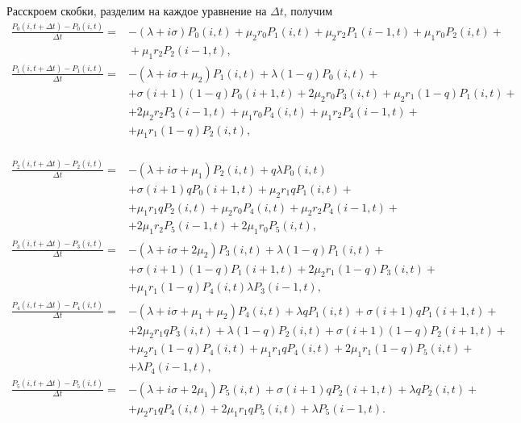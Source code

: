 Расскроем скобки, разделим на каждое уравнение на $\Delta t$, получим
 \begin{equation*}
	\begin{split}
		\frac{P_{0}(i,t+\Delta t) - P_{0}(i, t)}{\Delta t}=&-(\lambda+i\sigma)P_{0}(i,t)+\mu_{2}r_{0}P_{1}(i,t)+\mu_{2}r_{2}P_{1}(i-1,t)+\mu_{1}r_{0}P_{2}(i,t)+\\
		&{}+\mu_{1}r_{2}P_{2}(i-1,t),\\
		\frac{P_{1}(i,t+\Delta t) - P_{1}(i, t)}{\Delta t}=&-(\lambda+i\sigma+\mu_{2})P_{1}(i,t)+\lambda(1-q)P_{0}(i,t)+\\
		&+\sigma(i+1)(1-q)P_{0}(i+1,t)+2\mu_{2}r_{0}P_{3}(i,t) + \mu_{2}r_{1}(1-q)P_{1}(i,t)+\\
		&+2\mu_{2}r_{2}P_{3}(i-1,t)+\mu_{1}r_{0}P_{4}(i,t)+\mu_{1}r_{2}P_{4}(i-1,t)+\\
		&+\mu_{1}r_{1}(1-q)P_{2}(i,t),\\
	\end{split}
\end{equation*}
\begin{adjustwidth}{0pt}{0pt}
	\begin{align*}
		\frac{P_{2}(i,t+\Delta t) - P_{2}(i, t)}{\Delta t}=&-(\lambda+i\sigma+\mu_{1})P_{2}(i,t)+q\lambda P_{0}(i,t)\\
		&+\sigma(i+1)qP_{0}(i+1,t)+\mu_{2}r_{1}qP_{1}(i,t)+\\
		&+\mu_{1}r_{1}qP_{2}(i,t)+\mu_{2}r_{0}P_{4}(i,t)+\mu_{2}r_{2}P_{4}(i-1,t)+\\
		&+2\mu_{1}r_{2}P_{5}(i-1,t)+2\mu_{1}r_{0}P_{5}(i,t),\\
		\frac{P_{3}(i,t+\Delta t) - P_{3}(i, t)}{\Delta t}=&-(\lambda+i\sigma+2\mu_{2})P_{3}(i,t)+\lambda(1-q)P_{1}(i,t)+\\
		&+\sigma(i+1)(1-q)P_{1}(i+1,t)+2\mu_{2}r_{1}(1-q)P_{3}(i,t)+\\
		&+\mu_{1}r_{1}(1-q)P_{4}(i,t)\lambda P_{3}(i-1,t),\\
		\frac{P_{4}(i,t+\Delta t) - P_{4}(i, t)}{\Delta t}=&-(\lambda+i\sigma+\mu_{1}+\mu_{2})P_{4}(i,t)+\lambda qP_{1}(i,t)+\sigma(i+1)qP_{1}(i+1,t)+\\
		&+2\mu_{2}r_{1}qP_{3}(i,t)+\lambda(1-q)P_{2}(i,t)+\sigma(i+1)(1-q)P_{2}(i+1,t)+\\
		&+\mu_{2}r_{1}(1-q)P_{4}(i,t)+\mu_{1}r_{1}qP_{4}(i,t)+2\mu_{1}r_{1}(1-q)P_{5}(i,t)+\\
		&+\lambda P_{4}(i-1,t),\\
		\frac{P_{5}(i,t+\Delta t) - P_{5}(i, t)}{\Delta t}=&-(\lambda+i\sigma+2\mu_{1})P_{5}(i,t)+\sigma(i+1)qP_{2}(i+1,t)+\lambda qP_{2}(i,t)+\\
		&+\mu_{2}r_{1}qP_{4}(i,t)+2\mu_{1}r_{1}qP_{5}(i,t)+\lambda P_{5}(i-1,t).
	\end{align*}
\end{adjustwidth}
